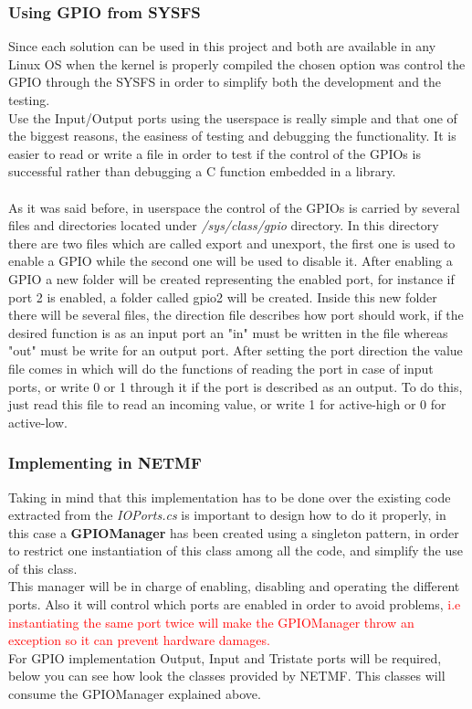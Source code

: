 \subsubsection{Using GPIO from SYSFS}\label{SSS:IOSharp-GPIO-SYSFS}
Since each solution can be used in this project and both are available in any Linux OS when the kernel is properly compiled the chosen option was control the GPIO through the SYSFS in order to simplify both the development and the testing.
\\
Use the Input/Output ports using the userspace is really simple and that one of the biggest reasons, the easiness of testing and debugging the functionality. It is easier to read or write a file in order to test if the control of the GPIOs is successful rather than debugging a C function embedded in a library.
\\
\\
As it was said before, in userspace the control of the GPIOs is carried by several files and directories located under \textit{/sys/class/gpio} directory. In this directory there are two files which are called export and unexport, the first one is used to enable a GPIO while the second one will be used to disable it. After enabling a GPIO a new folder will be created representing the enabled port, for instance if port 2 is enabled, a folder called gpio2 will be created. Inside this new folder there will be several files, the direction file describes how port should work, if the desired function is as an input port an "in" must be written in the file whereas "out" must be write for an output port. After setting the port direction the value file comes in which will do the functions of reading the port in case of input ports, or write 0 or 1 through it if the port is described as an output. To do this, just read this file to read an incoming value, or write 1 for active-high or 0 for active-low.

\subsubsection{Implementing in NETMF}\label{SSS:Implementing-GPIO-NETMF}
Taking in mind that this implementation has to be done over the existing code extracted from the \textit{IOPorts.cs} is important to design how to do it properly, in this case a \textbf{GPIOManager} has been created using a singleton pattern, in order to restrict one instantiation of this class among all the code, and simplify the use of this class.
\\
This manager will be in charge of enabling, disabling and operating the different ports. Also it will control which ports are enabled in order to avoid problems, \textcolor{red}{i.e instantiating the same port twice will make the GPIOManager throw an exception so it can prevent hardware damages.}
\\
For GPIO implementation Output, Input and Tristate ports will be required, below you can see how look the classes provided by NETMF. This classes will consume the GPIOManager explained above.

